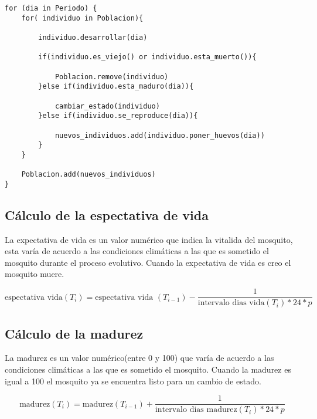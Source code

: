 \begin{lstlisting}[caption=Pseudocódigo del proceso evolutivo, label=a_label,  float=t]
for (dia in Periodo) {
    for( individuo in Poblacion){

        individuo.desarrollar(dia)

        if(individuo.es_viejo() or individuo.esta_muerto()){

            Poblacion.remove(individuo)
        }else if(individuo.esta_maduro(dia)){

            cambiar_estado(individuo)
        }else if(individuo.se_reproduce(dia)){

            nuevos_individuos.add(individuo.poner_huevos(dia))
        }
    }

    Poblacion.add(nuevos_individuos)
}
\end{lstlisting}


\subsection{Cálculo de la espectativa de vida}
La expectativa de vida es un valor numérico que indica la vitalida del
mosquito, esta varía de acuerdo a las condiciones climáticas a las que
es sometido el mosquito durante el proceso evolutivo. Cuando la expectativa
de vida es creo el mosquito muere.


\begin{equation}
\text{espectativa vida}(T_{i}) = \text{espectativa vida }(T_{i-1}) - \frac{1}{\text{intervalo dias vida}(T_{i}) * 24 * p}
\end{equation}
\subsection{Cálculo de la madurez}
La madurez es un valor numérico(entre 0 y 100) que varía de acuerdo
a las condiciones climáticas a las que es sometido el mosquito. Cuando la
madurez es igual a 100 el mosquito ya se encuentra listo para un cambio de
estado.

\begin{equation}
\text{madurez}(T_{i}) = \text{madurez}(T_{i-1}) + \frac{1}{\text{intervalo dias madurez}(T_{i}) * 24 * p}
\end{equation}
